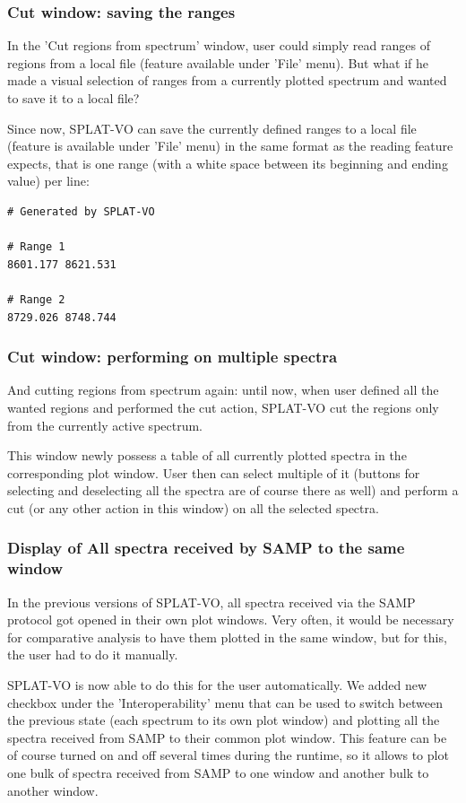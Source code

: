 \documentclass[final,authoryear,5p,times,twocolumn]{elsarticle}
\begin{document}
\subsubsection{Cut window: saving the ranges}

In the 'Cut regions from spectrum' window, user could simply read
ranges of regions from a local file (feature available under 'File'
menu). But what if he made a visual selection of ranges from a
currently plotted spectrum and wanted to save it to a local file?

Since now, SPLAT-VO can save the currently defined
ranges to a local file (feature is available under 'File' menu) in the
same format as the reading feature expects, that is one range (with a
white space between its beginning and ending value) per line:

\begin{verbatim}
# Generated by SPLAT-VO

# Range 1
8601.177 8621.531

# Range 2
8729.026 8748.744
\end{verbatim}

\subsubsection{Cut window: performing on multiple spectra}

And cutting regions from spectrum again: until now, when user defined
all the wanted regions and performed the cut action, SPLAT-VO cut the
regions only from the currently active spectrum.

This window newly possess a table of all
currently plotted spectra in the corresponding plot window. User then
can select multiple of it (buttons for selecting and deselecting all
the spectra are of course there as well) and perform a cut (or any
other action in this window) on all the selected spectra.

\subsubsection{Display of All  spectra received by SAMP to the same  window}

In the previous versions of SPLAT-VO, all spectra received via the SAMP
protocol got opened in their own plot windows. Very often, it would be
necessary for comparative analysis to have them plotted in the same
window, but for this, the user had to do it manually.

SPLAT-VO is now able to do this
for the user automatically. We added new checkbox under the
'Interoperability' menu that can be used to switch between the previous
state (each spectrum to its own plot window) and plotting all the
spectra received from SAMP to their common plot window. This feature
can be of course turned on and off several times during the runtime,
so it allows to plot one bulk of spectra received from SAMP to one
window and another bulk to another window.
\end{document}
